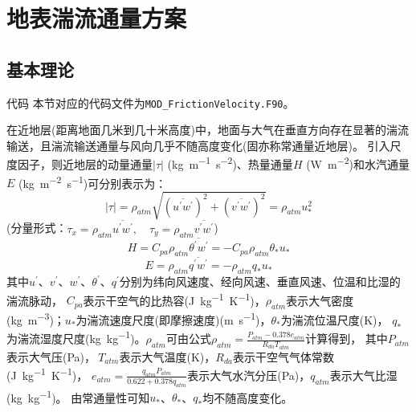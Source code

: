 \chapter{地表湍流通量方案}

\section{基本理论}\label{基本理论}
\begin{mymdframed}{代码}
本节对应的代码文件为\texttt{MOD\_FrictionVelocity.F90}。
\end{mymdframed}

在近地层(距离地面几米到几十米高度)中，地面与大气在垂直方向存在显著的湍流输送，且湍流输送通量与风向几乎不随高度变化(固亦称常通量近地层)。
引入尺度因子，则近地层的动量通量$\left|\tau\right|$ (\unit{kg.m^{-1}.s^{-2}})、热量通量$H$ (\unit{W.m^{-2}})和水汽通量$E$ (\unit{kg.m^{-2}.s^{-1}})可分别表示为：
\begin{equation}
|\tau|=\rho_{atm} \sqrt{ \left(\overline{u^{\prime} w^{\prime}}\right)^{2} + \left(\overline{v^{\prime} w^{\prime}}\right)^{2} }=\rho_{atm} u_{*}^{2}
\end{equation}
(分量形式：$\tau_{x}=\rho_{atm} \overline{u^{\prime} w^{\prime}}, \quad \tau_{y}=\rho_{atm} \overline{v^{\prime} w^{\prime}}$)
\begin{equation}
H=C_{p a} \rho_{atm} \overline{\theta^{\prime} w^{\prime}}=-C_{p a} \rho_{atm} \theta_{*} u_{*}
\end{equation}
\begin{equation}
E=\rho_{atm} \overline{q^{\prime} w^{\prime}}=-\rho_{atm} q_{*} u_{*}
\end{equation}
其中$u^\prime$、$v^\prime$、$w^\prime$、$\theta^\prime$、$q^\prime$分别为纬向风速度、经向风速、垂直风速、位温和比湿的湍流脉动，
$C_{pa}$表示干空气的比热容(\unit{J.kg^{-1}.K^{-1}})，$\rho_{atm}$表示大气密度(\unit{kg.m^{-3}})；$u_\ast$为湍流速度尺度(即摩擦速度)(\unit{m.s^{-1}})，$\theta_\ast$为湍流位温尺度(K)，
$q_\ast$为湍流湿度尺度(\unit{kg.kg^{-1}})。$\rho_{atm}$可由公式$\rho_{atm}=\frac{P_{atm}-0.378e_{atm}}{R_{da}T_{atm}}$计算得到，
其中$P_{atm}$表示大气压(Pa)，$\ T_{atm}$表示大气温度(K)，$R_{da}$表示干空气气体常数(\unit{J.kg^{-1}.K^{-1}})，
$e_{atm}=\frac{q_{atm}P_{atm}}{0.622+0.378q_{atm}}$表示大气水汽分压(Pa)，$q_{atm}$表示大气比湿(\unit{kg.kg^{-1}})。
由常通量性可知$u_\ast$、$\theta_\ast$、$q_\ast$均不随高度变化。


